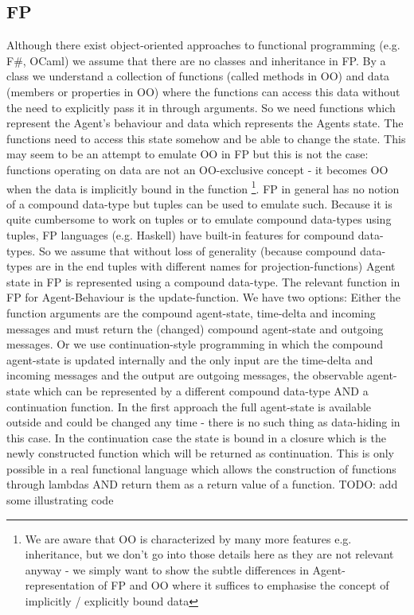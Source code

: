 \subsection{FP}
Although there exist object-oriented approaches to functional programming (e.g. F\#, OCaml) we assume that there are no classes and inheritance in FP. By a class we understand a collection of functions (called methods in OO) and data (members or properties in OO) where the functions can access this data without the need to explicitly pass it in through arguments.
So we need functions which represent the Agent's behaviour and data which represents the Agents state. The functions need to access this state somehow and be able to change the state. This may seem to be an attempt to emulate OO in FP but this is not the case: functions operating on data are not an OO-exclusive concept - it becomes OO when the data is implicitly bound in the function \footnote{We are aware that OO is characterized by many more features e.g. inheritance, but we don't go into those details here as they are not relevant anyway - we simply want to show the subtle differences in Agent-representation of FP and OO where it suffices to emphasise the concept of implicitly / explicitly bound data}.
FP in general has no notion of a compound data-type but tuples can be used to emulate such. Because it is quite cumbersome to work on tuples or to emulate compound data-types using tuples, FP languages (e.g. Haskell) have built-in features for compound data-types. So we assume that without loss of generality (because compound data-types are in the end tuples with different names for projection-functions) Agent state in FP is represented using a compound data-type.
The relevant function in FP for Agent-Behaviour is the update-function. We have two options:
Either the function arguments are the compound agent-state, time-delta and incoming messages and must return the (changed) compound agent-state and outgoing messages.
Or we use continuation-style programming in which the compound agent-state is updated internally and the only input are the time-delta and incoming messages and the output are outgoing messages, the observable agent-state which can be represented by a different compound data-type AND a continuation function.
In the first approach the full agent-state is available outside and could be changed any time - there is no such thing as data-hiding in this case. In the continuation case the state is bound in a closure which is the newly constructed function which will be returned as continuation. This is only possible in a real functional language which allows the construction of functions through lambdas AND return them as a return value of a function. TODO: add some illustrating code

